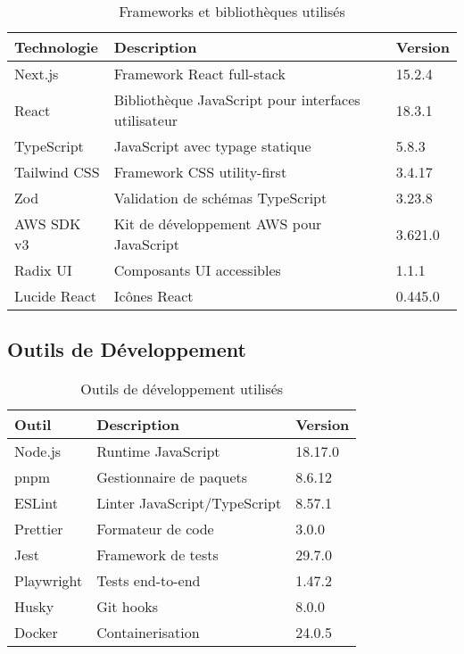 \begin{table}[H]
    \centering
    \begin{tabularx}{\textwidth}{|l|X|l|}
        \hline
        \textbf{Technologie} & \textbf{Description} & \textbf{Version} \\
        \hline
        Next.js & Framework React full-stack & 15.2.4 \\
        \hline
        React & Bibliothèque JavaScript pour interfaces utilisateur & 18.3.1 \\
        \hline
        TypeScript & JavaScript avec typage statique & 5.8.3 \\
        \hline
        Tailwind CSS & Framework CSS utility-first & 3.4.17 \\
        \hline
        Zod & Validation de schémas TypeScript & 3.23.8 \\
        \hline
        AWS SDK v3 & Kit de développement AWS pour JavaScript & 3.621.0 \\
        \hline
        Radix UI & Composants UI accessibles & 1.1.1 \\
        \hline
        Lucide React & Icônes React & 0.445.0 \\
        \hline
    \end{tabularx}
    \caption{Frameworks et bibliothèques utilisés}
    \label{tab:frameworks}
\end{table}

\subsection{Outils de Développement}

\begin{table}[H]
    \centering
    \begin{tabularx}{\textwidth}{|l|X|l|}
        \hline
        \textbf{Outil} & \textbf{Description} & \textbf{Version} \\
        \hline
        Node.js & Runtime JavaScript & 18.17.0 \\
        \hline
        pnpm & Gestionnaire de paquets & 8.6.12 \\
        \hline
        ESLint & Linter JavaScript/TypeScript & 8.57.1 \\
        \hline
        Prettier & Formateur de code & 3.0.0 \\
        \hline
        Jest & Framework de tests & 29.7.0 \\
        \hline
        Playwright & Tests end-to-end & 1.47.2 \\
        \hline
        Husky & Git hooks & 8.0.0 \\
        \hline
        Docker & Containerisation & 24.0.5 \\
        \hline
    \end{tabularx}
    \caption{Outils de développement utilisés}
    \label{tab:dev_tools_ref}
\end{table}

